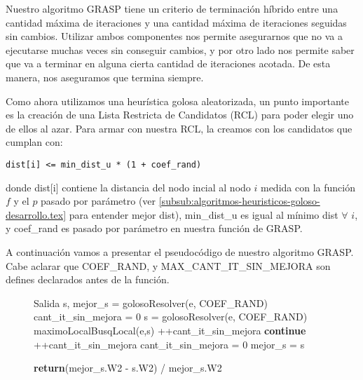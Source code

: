 Nuestro algoritmo GRASP tiene un criterio de terminación híbrido entre una cantidad máxima de iteraciones y una cantidad máxima de iteraciones seguidas sin cambios. Utilizar ambos componentes nos permite asegurarnos que no va a ejecutarse muchas veces sin conseguir cambios, y por otro lado nos permite saber que va a terminar en alguna cierta cantidad de iteraciones acotada. De esta manera, nos aseguramos que termina siempre.

Como ahora utilizamos una heurística golosa aleatorizada, un punto importante es la creación de una Lista Restricta de Candidatos (RCL) para poder elegir uno de ellos al azar. Para armar con nuestra RCL, la creamos con los candidatos que cumplan con:

\begin{verbatim}
dist[i] <= min_dist_u * (1 + coef_rand)
\end{verbatim}

donde dist[i] contiene la distancia del nodo incial al nodo $i$ medida con la función $f$ y el $p$ pasado por parámetro (ver \ref{subsub:algoritmos-heuristicos-goloso-desarrollo.tex} para entender mejor dist), min\_dist\_u es igual al mínimo dist $\forall$ $i$, y coef\_rand es pasado por parámetro en nuestra función de GRASP.

A continuación vamos a presentar el pseudocódigo de nuestro algoritmo GRASP. Cabe aclarar que COEF\_RAND, y MAX\_CANT\_IT\_SIN\_MEJORA son defines declarados antes de la función.

\begin{center}
 \begin{figure}[H]
  \begin{pseudo}
    \State Salida s, mejor\_s = golosoResolver(e, COEF\_RAND)
    \State cant\_it\_sin\_mejora = 0   
      \State s = golosoResolver(e, COEF\_RAND)
      \State maximoLocalBusqLocal(e,s)
	\State++cant\_it\_sin\_mejora
	\State \textbf{continue}
      \EndIf
	\State ++cant\_it\_sin\_mejora
      \Else
	\State cant\_it\_sin\_mejora = 0
      \EndIf
	\State mejor\_s = s
      \EndIf
    \EndWhile
    \EndProcedure
  \end{pseudo}
 \end{figure}
\end{center}

\begin{center}
 \begin{figure}[H]
  \begin{pseudo}
    \State \textbf{return}(mejor\_s.W2 - s.W2) / mejor\_s.W2
  \EndProcedure
  \end{pseudo}
 \end{figure}
\end{center}